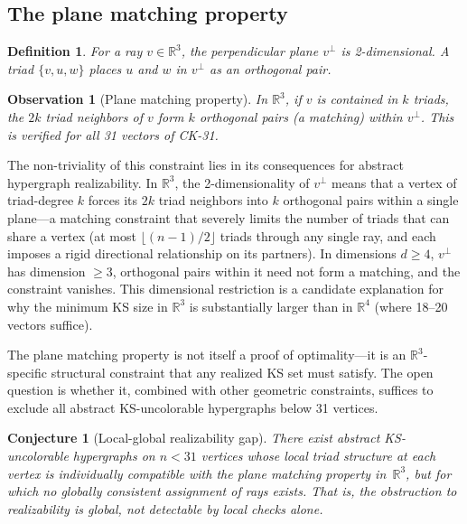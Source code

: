 \documentclass[twocolumn,pra,superscriptaddress,nofootinbib]{revtex4-2}
\newtheorem{conjecture}{Conjecture}
\newtheorem{definition}{Definition}
\newtheorem{observation}{Observation}
\newcommand{\R}{\mathbb{R}}
\begin{document}
\subsection{The plane matching property}\label{sec:planematching}

\begin{definition}
For a ray $v \in \R^3$, the perpendicular plane $v^\perp$ is 2-dimensional. A triad $\{v, u, w\}$ places $u$ and $w$ in $v^\perp$ as an orthogonal pair.
\end{definition}

\begin{observation}[Plane matching property]
\label{obs:planematching}
In $\R^3$, if $v$ is contained in $k$ triads, the $2k$ triad neighbors of $v$ form $k$ orthogonal pairs (a matching) within $v^\perp$. This is verified for all 31 vectors of CK-31.
\end{observation}

The non-triviality of this constraint lies in its consequences for abstract hypergraph realizability. In $\R^3$, the 2-dimensionality of $v^\perp$ means that a vertex of triad-degree $k$ forces its $2k$ triad neighbors into $k$ orthogonal pairs within a single plane---a matching constraint that severely limits the number of triads that can share a vertex (at most $\lfloor (n-1)/2 \rfloor$ triads through any single ray, and each imposes a rigid directional relationship on its partners). In dimensions $d \geq 4$, $v^\perp$ has dimension $\geq 3$, orthogonal pairs within it need not form a matching, and the constraint vanishes. This dimensional restriction is a candidate explanation for why the minimum KS size in $\R^3$ is substantially larger than in $\R^4$ (where 18--20 vectors suffice).

The plane matching property is not itself a proof of optimality---it is an $\R^3$-specific structural constraint that any realized KS set must satisfy. The open question is whether it, combined with other geometric constraints, suffices to exclude all abstract KS-uncolorable hypergraphs below 31 vertices.

\begin{conjecture}[Local-global realizability gap]
\label{conj:planematching}
There exist abstract KS-uncolorable hypergraphs on $n < 31$ vertices whose local triad structure at each vertex is individually compatible with the plane matching property in~$\R^3$, but for which no globally consistent assignment of rays exists. That is, the obstruction to realizability is global, not detectable by local checks alone.
\end{conjecture}
\end{document}
